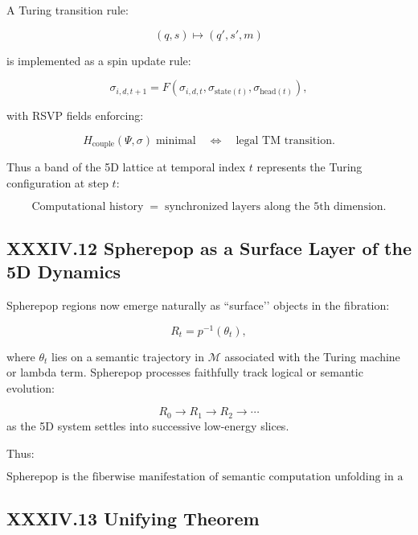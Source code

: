 \documentclass[12pt,letterpaper]{article}
\begin{document}
A Turing transition rule:

\[
(q, s) \mapsto (q', s', m)
\]

is implemented as a spin update rule:

\[
\sigma_{i,d,t+1} = F(\sigma_{i,d,t}, \sigma_{\text{state}(t)}, \sigma_{\text{head}(t)}),
\]

with RSVP fields enforcing:

\[
H_{\text{couple}}(\Psi, \sigma) 
\; \text{minimal} 
\quad\Longleftrightarrow\quad
\text{legal TM transition}.
\]

Thus a band of the 5D lattice at temporal index $t$ represents the Turing configuration at step $t$:

\[
\boxed{
\text{Computational history} \;=\; \text{synchronized layers along the 5th dimension}.
}
\]

\subsection{XXXIV.12 Spherepop as a Surface Layer of the 5D Dynamics}

Spherepop regions now emerge naturally as ``surface’’ objects in the fibration:

\[
R_t = p^{-1}(\theta_t),
\]

where $\theta_t$ lies on a semantic trajectory in $\mathcal{M}$ associated with the Turing machine or lambda term. Spherepop processes faithfully track logical or semantic evolution:

\[
R_0 \to R_1 \to R_2 \to \cdots
\]
as the 5D system settles into successive low-energy slices.

Thus:

\[
\boxed{
\text{Spherepop is the fiberwise manifestation of semantic computation
unfolding in a higher-dimensional RSVP–Ising manifold.}
}
\]

\subsection{XXXIV.13 Unifying Theorem}
\end{document}

